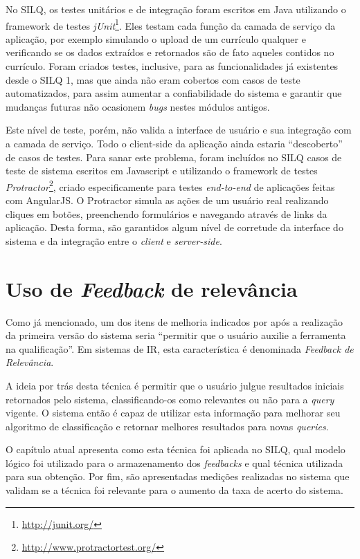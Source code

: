 \documentclass[12pt]{article}
\newcommand{\quotes}[1]{``#1''}
\begin{document}
No SILQ, os testes unitários e de integração foram escritos em Java utilizando o framework de testes \textit{jUnit}\footnote{\url{http://junit.org/}}. Eles testam cada função da camada de serviço da aplicação, por exemplo simulando o upload de um currículo qualquer e verificando se os dados extraídos e retornados são de fato aqueles contidos no currículo. Foram criados testes, inclusive, para as funcionalidades já existentes desde o SILQ 1, mas que ainda não eram cobertos com casos de teste automatizados, para assim aumentar a confiabilidade do sistema e garantir que mudanças futuras não ocasionem \textit{bugs} nestes módulos antigos.

Este nível de teste, porém, não valida a interface de usuário e sua integração com a camada de serviço. Todo o client-side da aplicação ainda estaria \quotes{descoberto} de casos de testes. Para sanar este problema, foram incluídos no SILQ casos de teste de sistema escritos em Javascript e utilizando o framework de testes \textit{Protractor}\footnote{\url{http://www.protractortest.org/}}, criado especificamente para testes \textit{end-to-end} de aplicações feitas com AngularJS. O Protractor simula as ações de um usuário real realizando cliques em botões, preenchendo formulários e navegando através de links da aplicação. Desta forma, são garantidos algum nível de corretude da interface do sistema e da integração entre o \textit{client} e \textit{server-side}.

\section{Uso de \textit{Feedback} de relevância} \label{cap:avaliacao}

Como já mencionado, um dos itens de melhoria indicados por \cite{Silq1} após a realização da primeira versão do sistema seria \quotes{permitir que o usuário auxilie a ferramenta na qualificação}. Em sistemas de IR, esta característica é denominada \textit{Feedback de Relevância}.

A ideia por trás desta técnica é permitir que o usuário julgue resultados iniciais retornados pelo sistema, classificando-os como relevantes ou não para a \textit{query} vigente. O sistema então é capaz de utilizar esta informação para melhorar seu algoritmo de classificação e retornar melhores resultados para novas \textit{queries}.

O capítulo atual apresenta como esta técnica foi aplicada no SILQ, qual modelo lógico foi utilizado para o armazenamento dos \textit{feedbacks} e qual técnica utilizada para sua obtenção. Por fim, são apresentadas medições realizadas no sistema que validam se a técnica foi relevante para o aumento da taxa de acerto do sistema.
\end{document}
